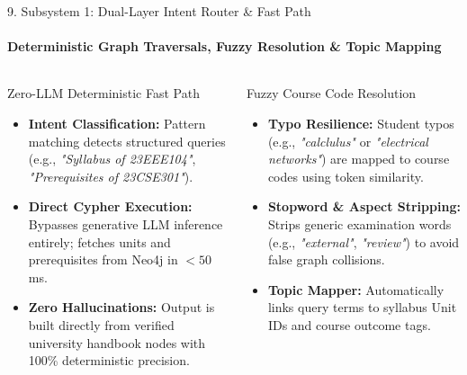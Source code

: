 \documentclass[aspectratio=169, 11pt]{beamer}
\begin{document}
\begin{frame}{9. Subsystem 1: Dual-Layer Intent Router \& Fast Path}
    \framesubtitle{Deterministic Graph Traversals, Fuzzy Resolution \& Topic Mapping}
    \begin{columns}[T]
        \begin{block}{Zero-LLM Deterministic Fast Path}
            \footnotesize
            \begin{itemize}
                \item \textbf{Intent Classification:} Pattern matching detects structured queries (e.g., \textit{"Syllabus of 23EEE104"}, \textit{"Prerequisites of 23CSE301"}).
                \item \textbf{Direct Cypher Execution:} Bypasses generative LLM inference entirely; fetches units and prerequisites from Neo4j in $<50$\,ms.
                \item \textbf{Zero Hallucinations:} Output is built directly from verified university handbook nodes with 100\% deterministic precision.
            \end{itemize}
        \end{block}

        \begin{block}{Fuzzy Course Code Resolution}
            \footnotesize
            \begin{itemize}
                \item \textbf{Typo Resilience:} Student typos (e.g., \textit{"calclulus"} or \textit{"electrical networks"}) are mapped to course codes using token similarity.
                \item \textbf{Stopword \& Aspect Stripping:} Strips generic examination words (e.g., \textit{"external"}, \textit{"review"}) to avoid false graph collisions.
                \item \textbf{Topic Mapper:} Automatically links query terms to syllabus Unit IDs and course outcome tags.
            \end{itemize}
        \end{block}
    \end{columns}
\end{frame}
\end{document}
